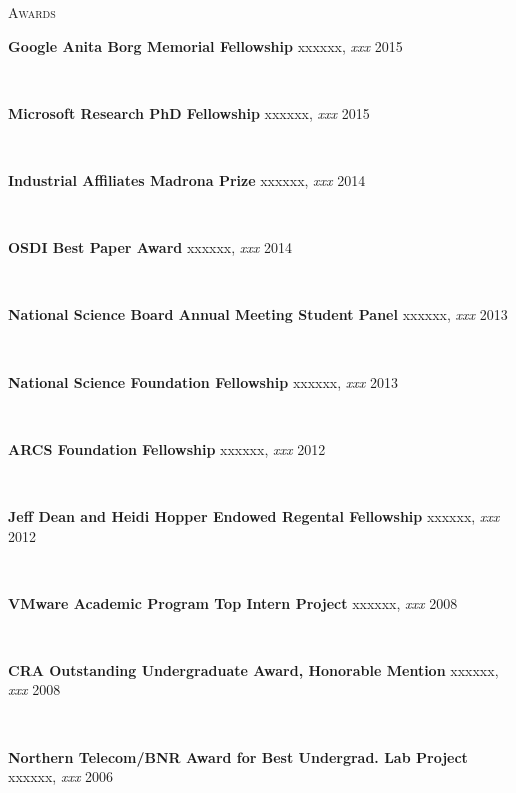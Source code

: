 \documentclass[10pt,times]{report}
\newlength{\sectiongap}
\newlength{\entrygap}
\newlength{\sectioncolwidth}
\newlength{\colgap}
\newlength{\stuffwidth}
\def\ifEqString#1#2{\def\testa{#1}\def\testb{#2}%
  \ifx\testa\testb}
\newenvironment{rtable}{
  \begin{minipage}{\textwidth}
  }{
  \end{minipage}
}
\newenvironment{rentry}[3][xxx]{
  \begin{minipage}[t]{\hsize}
    \textbf{#2}\ifEqString{#1}{xxx}\relax\else, \textit{#1}\fi
    \hspace{\stretch{1}} #3 \\
  }{
    \removelastskip
  \end{minipage}
  \\[\entrygap]  %
}
\newenvironment{rsection}[1]{
  \begin{minipage}[t]{\sectioncolwidth}
    \textsc{#1}
  \end{minipage}
  \hspace{\colgap}
  \begin{minipage}[t]{\stuffwidth}
  }{
    \removelastskip
  \end{minipage}
  \\[\sectiongap]
}
\begin{document}
\begin{rtable}
  \begin{rsection}{Awards}

    \begin{rentry}{Google Anita Borg Memorial Fellowship}{2015}
      \vspace{-0.5em}
    \end{rentry} 
    \begin{rentry}{Microsoft Research PhD Fellowship}{2015}
      \vspace{-0.5em}
    \end{rentry} 
    \begin{rentry}{Industrial Affiliates Madrona Prize}{2014}
       \vspace{-0.5em}
    \end{rentry}
    \begin{rentry}{OSDI Best Paper Award}{2014}
      \vspace{-0.5em}
    \end{rentry}
    \begin{rentry}{National Science Board Annual Meeting Student
        Panel}{2013}
      \vspace{-0.5em}
    \end{rentry}
    \begin{rentry}{National Science Foundation Fellowship}{2013}
      \vspace{-0.5em}
    \end{rentry}
    \begin{rentry}{ARCS Foundation Fellowship}{2012}
       \vspace{-0.5em}
    \end{rentry}
    \begin{rentry}{Jeff Dean and Heidi Hopper Endowed Regental Fellowship}{2012}
       \vspace{-0.5em}
    \end{rentry}
    \begin{rentry}{VMware Academic Program Top Intern Project}{2008}
       \vspace{-0.5em}
    \end{rentry}
    \begin{rentry}{CRA Outstanding Undergraduate Award, Honorable
      Mention}{2008}
    \vspace{-0.5em}
    \end{rentry}
    \begin{rentry}{Northern Telecom/BNR Award for Best Undergrad. Lab
        Project}{2006}
      \vspace{-0.5em}
    \end{rentry}
  \end{rsection}


\end{rtable}
\end{document}
